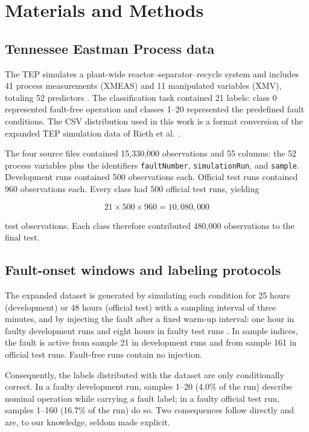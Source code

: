\documentclass[10pt,twocolumn,a4paper]{article}
\begin{document}
\section{Materials and Methods}

\subsection{Tennessee Eastman Process data}

The TEP simulates a plant-wide reactor--separator--recycle system and includes
41 process measurements (XMEAS) and 11 manipulated variables (XMV), totaling 52
predictors \cite{downs1993tep}. The classification task contained 21 labels:
class 0 represented fault-free operation and classes 1--20 represented the
predefined fault conditions. The CSV distribution used in this work is a format
conversion of the expanded TEP simulation data of Rieth et al.
\cite{rieth2017data,kaggleTEP}.

The four source files contained 15,330,000 observations and 55 columns: the 52
process variables plus the identifiers \texttt{faultNumber},
\texttt{simulationRun}, and \texttt{sample}. Development runs contained 500
observations each. Official test runs contained 960 observations each. Every
class had 500 official test runs, yielding

\begin{equation}
21\times 500\times 960=10{,}080{,}000
\end{equation}

test observations. Each class therefore contributed 480,000 observations to
the final test.

\subsection{Fault-onset windows and labeling protocols}
\label{sec:onset}

The expanded dataset is generated by simulating each condition for 25 hours
(development) or 48 hours (official test) with a sampling interval of three
minutes, and by injecting the fault after a fixed warm-up interval: one hour in
faulty development runs and eight hours in faulty test runs
\cite{rieth2017data,rieth2018issues,reinartz2021extended}. In sample indices,
the fault is active from sample 21 in development runs and from sample 161 in
official test runs. Fault-free runs contain no injection.

Consequently, the labels distributed with the dataset are only conditionally
correct. In a faulty development run, samples 1--20 (4.0\% of the run) describe
nominal operation while carrying a fault label; in a faulty official test run,
samples 1--160 (16.7\% of the run) do so. Two consequences follow directly and
are, to our knowledge, seldom made explicit.
\end{document}

